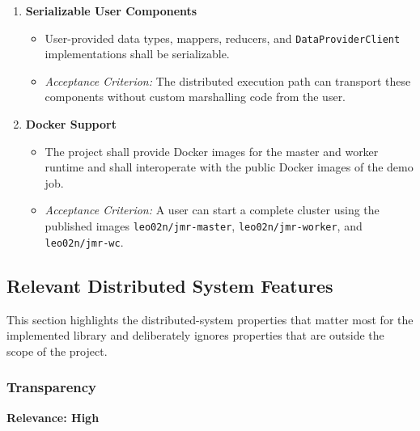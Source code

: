 \documentclass{scrartcl}
\begin{document}
\begin{enumerate}[label=\textbf{IR-\arabic*}]
    \item \textbf{Serializable User Components}
          \begin{itemize}
              \item User-provided data types, mappers, reducers, and \texttt{DataProviderClient} implementations shall be serializable.
              \item \textit{Acceptance Criterion:} The distributed execution path can transport these components without custom marshalling code from the user.
          \end{itemize}

    \item \textbf{Docker Support}
          \begin{itemize}
              \item The project shall provide Docker images for the master and worker runtime and shall interoperate with the public Docker images of the demo job.
              \item \textit{Acceptance Criterion:} A user can start a complete cluster using the published images \texttt{leo02n/jmr-master}, \texttt{leo02n/jmr-worker}, and \texttt{leo02n/jmr-wc}.
          \end{itemize}
\end{enumerate}

\subsection{Relevant Distributed System Features}
\label{ds-features}

This section highlights the distributed-system properties that matter most for the implemented library and deliberately ignores properties that are outside the scope of the project.

\subsubsection{Transparency}

\textbf{Relevance: High}
\end{document}
